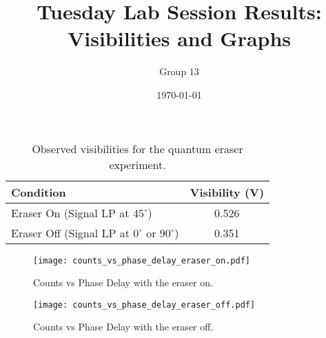 \documentclass{article}
\title{Tuesday Lab Session Results: Visibilities and Graphs}
\author{Group 13} %
\date{\today}
\begin{document}
\pagestyle{empty} %

\begin{table}[h!]
\centering
\begin{tabular}{lc}
\toprule
\textbf{Condition} & \textbf{Visibility (V)} \\
\midrule
Eraser On (Signal LP at $45^\circ$)          & 0.526 \\
Eraser Off (Signal LP at $0^\circ$ or $90^\circ$) & 0.351 \\
\bottomrule
\end{tabular}
\caption{Observed visibilities for the quantum eraser experiment.}
\end{table}


\begin{figure}[h!]
\centering
\texttt{[image: counts\_vs\_phase\_delay\_eraser\_on.pdf]}
\caption{Counts vs Phase Delay with the eraser on.}
\label{fig:eraser_on}
\end{figure}


\begin{figure}[h!]
\centering
\texttt{[image: counts\_vs\_phase\_delay\_eraser\_off.pdf]}
\caption{Counts vs Phase Delay with the eraser off.}
\label{fig:eraser_off}
\end{figure}
\end{document}
